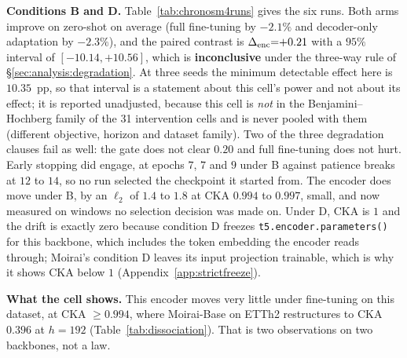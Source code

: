 \begin{table}[ht]
\centering
\caption{\textbf{Conditions B and D on Chronos/M4-Monthly}, $n{=}500$ training
windows, lr $10^{-5}$, batch $32$, $20$ epochs with patience $5$, early stopping
on the selection windows and best epoch ${\geq}1$.  Forgetting is \% change in
held-out MSE against the same seed's zero-shot measurement (\emph{negative is
better than zero-shot}); $\denc$ is the paired difference.  CKA is the linear CKA
of the mean-pooled final encoder output on the $200$ selection contexts, and the
$\ell_2$ column is the encoder state dict's distance from pre-trained.  Under
condition D both are fixed \emph{by construction} and not by measurement: on
Chronos, freezing the encoder freezes the shared token embedding with it.}
\label{tab:chronosm4runs}

\end{table}

\textbf{Conditions B and D.}
Table~\ref{tab:chronosm4runs} gives the six runs.  Both arms improve on
zero-shot on average (full fine-tuning by $-2.1\%$ and decoder-only
adaptation by $-2.3\%$), and the paired contrast is
$\Delta_\text{enc}{=}{+}0.21$ with a $95\%$ interval of $[-10.14, +10.56]$, which is
\textbf{inconclusive} under the three-way rule of \S\ref{sec:analysis:degradation}.
At three seeds the minimum detectable effect here is $10.35$~pp, so that
interval is a statement about this cell's power and not about its effect; it is
reported unadjusted, because this cell is \emph{not} in the Benjamini--Hochberg
family of the 31 intervention cells and is never pooled with them (different
objective, horizon and dataset family).  Two of the three degradation clauses
fail as well: the gate does not clear $0.20$ and full fine-tuning does not hurt.
Early stopping did engage, at epochs $7$, $7$ and $9$ under B against patience
breaks at $12$ to $14$, so no run selected the checkpoint it started from.  The
encoder does move under B, by an $\ell_2$ of $1.4$ to $1.8$ at CKA
$0.994$ to $0.997$, small, and now measured on windows no selection decision
was made on.  Under D, CKA is $1$ and the drift is exactly zero because
condition D freezes \texttt{t5.encoder.parameters()} for this backbone, which
includes the token embedding the encoder reads through; Moirai's condition D
leaves its input projection trainable, which is why it shows CKA below $1$
(Appendix~\ref{app:strictfreeze}).

\textbf{What the cell shows.}  This encoder moves very little under fine-tuning on
this dataset, at CKA ${\geq}0.994$, where Moirai-Base on ETTh2 restructures to CKA
$0.396$ at $h{=}192$ (Table~\ref{tab:dissociation}).  That is two observations on
two backbones, not a law.


